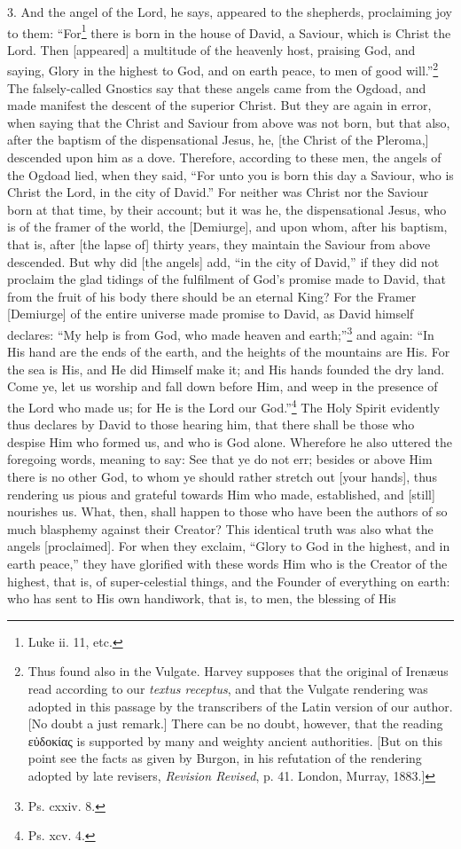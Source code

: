 3. And the angel of the Lord, he says,  appeared to the shepherds, proclaiming joy to them: “For\footnote{Luke ii. 11, etc.} there is born in the house of David, a Saviour, which is Christ the Lord. Then [appeared] a multitude of the heavenly host, praising God, and saying, Glory in the highest to God, and on earth peace, to men of good will.”\footnote{Thus found also in the Vulgate. Harvey supposes that the original of Irenæus read according to our \emph{textus receptus}, and that the Vulgate rendering was adopted in this passage by the transcribers of the Latin version of our author. [No doubt a just remark.] There can be no doubt, however, that the reading \textgreek{εὐδοκίας} is supported by many and weighty ancient authorities. [But on this point see the facts as given by Burgon, in his refutation of the rendering adopted by late revisers, \emph{Revision Revised}, p. 41. London, Murray, 1883.]} The falsely-called Gnostics say that these angels came from the Ogdoad, and made manifest the descent of the superior Christ. But they are again in error, when saying that the Christ and Saviour from above was not born, but that also, after the baptism of the dispensational Jesus, he, [the Christ of the Pleroma,] descended upon him as a dove. Therefore, according to these men, the angels of the Ogdoad lied, when they said, “For unto you is born this day a Saviour, who is Christ the Lord, in the city of David.” For neither was Christ nor the Saviour born at that time, by their account; but it was he, the dispensational Jesus, who is of the framer of the world, the [Demiurge], and upon whom, after his baptism, that is, after [the lapse of] thirty years, they maintain the Saviour from above descended. But why did [the angels] add, “in the city of David,” if they did not proclaim the glad tidings of the fulfilment of God’s promise made to David, that from the fruit of his body there should be an eternal King? For the Framer [Demiurge] of the entire universe made promise to David, as David himself declares: “My help is from God, who made heaven and earth;”\footnote{Ps. cxxiv. 8.} and again: “In His hand are the ends of the earth, and the heights of the mountains are His. For the sea is His, and He did Himself make it; and His hands founded the dry land. Come ye, let us worship and fall down before Him, and weep in the presence of the Lord who made us; for He is the Lord our God.”\footnote{Ps. xcv. 4.} The Holy Spirit evidently thus declares by David to those hearing him, that there shall be those who despise Him who formed us, and who is God alone. Wherefore he also uttered the foregoing words, meaning to say: See that ye do not err; besides or above Him there is no other God, to whom ye should rather stretch out [your hands], thus rendering us pious and grateful towards Him who made, established, and [still] nourishes us. What, then, shall happen to those who have been the authors of so much blasphemy against their Creator? This identical truth was also what the angels [proclaimed]. For when they exclaim, “Glory to God in the highest, and in earth peace,” they have glorified with these words Him who is the Creator of the highest, that is, of super-celestial things, and the Founder of everything on earth: who has sent to His own handiwork, that is, to men, the blessing of His 